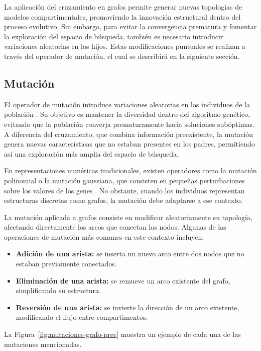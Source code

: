 La aplicación del cruzamiento en grafos permite generar nuevas topologías de modelos compartimentales, promoviendo la innovación estructural dentro del proceso 
evolutivo. Sin embargo, para evitar la convergencia prematura y fomentar la exploración del espacio de búsqueda, también es necesario introducir variaciones 
aleatorias en los hijos. Estas modificaciones puntuales se realizan a través del operador de mutación, el cual se describirá en la siguiente sección.


\subsection{Mutación}

El operador de mutación introduce variaciones aleatorias en los individuos de la población \cite{Goldberg89}. Su objetivo es mantener la diversidad dentro del 
algoritmo genético, evitando que la población converja prematuramente hacia soluciones subóptimas. A diferencia del cruzamiento, que combina información preexistente, 
la mutación genera nuevas características que no estaban presentes en los padres, permitiendo así una exploración más amplia del espacio de búsqueda.

En representaciones numéricas tradicionales, existen operadores como la mutación polinomial o la mutación gaussiana, que consisten en pequeñas perturbaciones sobre 
los valores de los genes \cite{DebBeyer01Final}. No obstante, cuando los individuos representan estructuras discretas como grafos, la mutación debe adaptarse a ese 
contexto.

La mutación aplicada a grafos consiste en modificar aleatoriamente su topología, afectando directamente los arcos que conectan los nodos. Algunas de las operaciones 
de mutación más comunes en este contexto incluyen:

\begin{itemize}
    \item \textbf{Adición de una arista:} se inserta un nuevo arco entre dos nodos que no estaban previamente conectados.
    \item \textbf{Eliminación de una arista:} se remueve un arco existente del grafo, simplificando su estructura.
    \item \textbf{Reversión de una arista:} se invierte la dirección de un arco existente, modificando el flujo entre compartimentos.
\end{itemize}

La Figura~\ref{fig:mutaciones-grafo-pree} muestra un ejemplo de cada una de las mutaciones mencionadas. 

